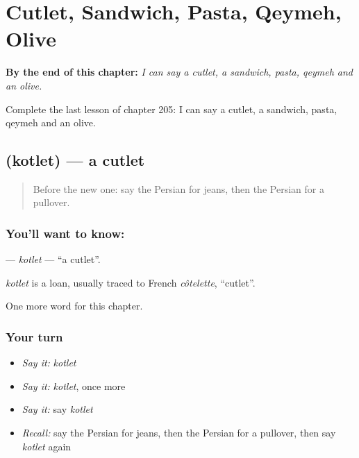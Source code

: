 
\chapter{Cutlet, Sandwich, Pasta, Qeymeh, Olive}
\label{ch:fa-cutlet-sandwich-pasta-qeymeh-olive}

\begin{chapteropening}
\textbf{By the end of this chapter:} \emph{I can say a cutlet, a sandwich, pasta, qeymeh and an olive.}

Complete the last lesson of chapter 205: I can say a cutlet, a sandwich, pasta, qeymeh and an olive.
\end{chapteropening}

\section[\texorpdfstring{\fa{کتلت} (kotlet)}{کتلت (kotlet)}]{ (kotlet) — a cutlet}

\label{lesson:FA-C205-kotlet}



\begin{quote}
Before the new one: say the Persian for jeans, then the Persian for a pullover.
\end{quote}

\subsection*{You'll want to know: }
\textbf{} — \emph{kotlet} — \textquotedblleft{}a cutlet\textquotedblright{}.

\begin{cousinweb}
\emph{kotlet} is a loan, usually traced to French \emph{côtelette}, \textquotedblleft{}cutlet\textquotedblright{}.
\end{cousinweb}

\begin{grammarlens}[title={What you've built}]
One more word for this chapter.
\end{grammarlens}

\subsection*{Your turn}
\begin{itemize}
\raggedright
  \item \emph{Say it:} \emph{kotlet}
  \item \emph{Say it:} \emph{kotlet}, once more
  \item \emph{Say it:} say \emph{kotlet}
  \item \emph{Recall:} say the Persian for jeans, then the Persian for a pullover, then say \emph{kotlet} again
\end{itemize}

